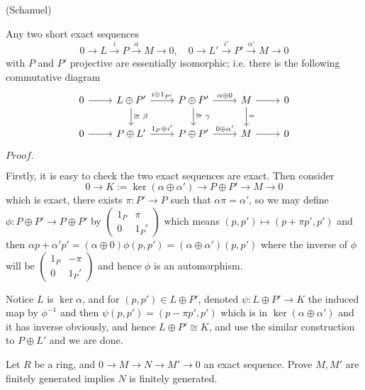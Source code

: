 \documentclass{article}
\newcommand{\Pf}[1]{$Proof.$\par}
\begin{document}
    \begin{lemma}
        (Schanuel)\par
        Any two short exact sequences
        \[0\to L \overset{i}{\to} P \overset{\alpha}{\to} M \to 0,\quad 0 \to L' \overset{i'}{\to} P' \overset{\alpha'}{\to} M \to 0\]
        with $P$ and $P'$ projective are essentially isomorphic; i.e. there is the following commutative diagram
        \[
        \begin{tikzcd}
            0\arrow[r] & L\oplus P'\arrow[r,"i\oplus 1_{P'}"]\arrow[d,"\cong\ \beta"] & P\oplus P'\arrow[r,"\alpha\oplus 0"]\arrow[d,"\cong\ \gamma"] & M\arrow[d,"="]\arrow[r] & 0 \\
            0\arrow[r] & P\oplus L'\arrow[r,"1_P\oplus i'"] & P\oplus P'\arrow[r,"0\oplus\alpha'"] & M\arrow[r] & 0
        \end{tikzcd}
        \]
    \end{lemma} 
    \Pf\par
        Firstly, it is easy to check the two exact sequences are exact. Then consider
        \[
        0 \to K:=\ker(\alpha\oplus\alpha') \to P\oplus P' \to M \to 0
        \]
        which is exact, there exists $\pi:P'\to P$ such that $\alpha\pi = \alpha'$, so we may define $\phi:P\oplus P' \to P\oplus P'$ by $\left(\begin{array}{cc}
        1_P & \pi \\
        0 & 1_P' 
        \end{array}\right)$ which means $(p,p')\mapsto (p+\pi p',p')$ and then $\alpha p+\alpha' p' = (\alpha\oplus 0)\phi(p,p') = (\alpha\oplus\alpha')(p,p')$ where the inverse of $\phi$ will be $\left(\begin{array}{cc}
        1_P & -\pi \\
        0 & 1_P' 
        \end{array}\right)$ and hence $\phi$ is an automorphism.\par
        Notice $L$ is $\ker \alpha$, and for $(p,p') \in L\oplus P'$, denoted $\psi:L\oplus P' \to K$ the induced map by $\phi^{-1}$ and then $\psi(p,p') = (p-\pi p' ,p')$ which is in $\ker(\alpha\oplus \alpha')$ and it has inverse obviously, and hence $L\oplus P' \cong K$, and use the similar construction to $P\oplus L'$ and we are done.
    \begin{proposition}
        Let $R$ be a ring, and $0\to M \to N \to M' \to 0$ an exact sequence. Prove $M,M'$ are finitely generated implies $N$ is finitely generated.    
    \end{proposition}
    
\end{document}
